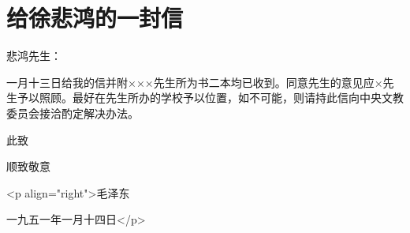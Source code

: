 \section[给徐悲鸿的一封信（一九五一年一月十四日）]{给徐悲鸿的一封信}


悲鸿先生：

一月十三日给我的信并附×××先生所为书二本均已收到。同意先生的意见应×先生予以照顾。最好在先生所办的学校予以位置，如不可能，则请持此信向中央文教委员会接洽酌定解决办法。

此致

顺致敬意

<p align="right">毛泽东

一九五一年一月十四日</p>


